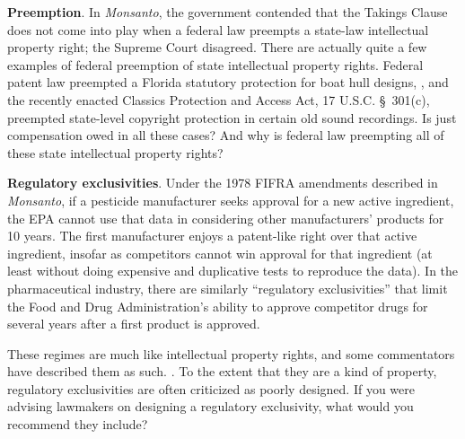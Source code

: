\item \textbf{Preemption}. In \emph{Monsanto}, the government contended that
the Takings Clause does not come into play when a federal law preempts
a state-law intellectual property right; the Supreme Court disagreed.
There are actually quite a few examples of federal preemption of state
intellectual property
rights. Federal patent law preempted a Florida statutory protection for boat
hull designs, , and the recently enacted Classics
Protection and Access Act, 17 U.S.C. \S~301(c), preempted state-level copyright
protection in certain old sound recordings. Is just compensation owed in all
these cases? And why is federal law preempting all of these state intellectual
property rights?


\item \textbf{Regulatory exclusivities}. Under the 1978 FIFRA amendments
described in \emph{Monsanto}, if a pesticide manufacturer seeks approval for a
new active ingredient, the EPA cannot use that data in considering other
manufacturers' products for 10 years. The first manufacturer enjoys a
patent-like right over that active ingredient, insofar as competitors cannot win
approval for that ingredient (at least without doing expensive and duplicative
tests to reproduce the data). In the pharmaceutical industry, there are
similarly ``regulatory exclusivities'' that limit the Food and Drug
Administration's ability to approve competitor drugs for several years after
a first product is approved.


These regimes are much like intellectual property rights, and some commentators
have described them as such. .
To the extent that they are a kind of property, regulatory exclusivities are
often criticized as poorly designed. If you were advising lawmakers on designing
a regulatory exclusivity, what would you recommend they include?



